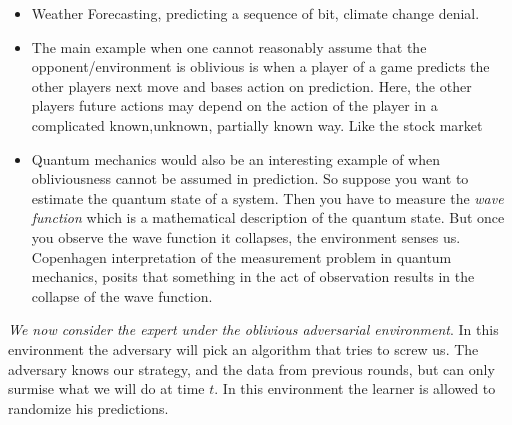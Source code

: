 \documentclass[11pt]{article}
\theoremstyle{quest}
\begin{document}
\begin{itemize}
	\item Weather Forecasting, predicting a sequence of bit, climate change denial.  
	\item The main example when one cannot reasonably assume that the opponent/environment is oblivious is when a player of a game predicts the other players next move and bases action on prediction. Here, the other players future actions may depend on the action of the player in a complicated known,unknown, partially known way. Like the stock market
	\item Quantum mechanics would also be an interesting example of when obliviousness cannot be assumed in prediction. So suppose you want to estimate the quantum state of a system. Then you have to measure the \textit{wave function} which is a mathematical description of the quantum state. But once you observe the wave function it collapses, the environment senses us. Copenhagen interpretation  of the measurement problem in  quantum mechanics, posits that something in the act of observation results in the collapse of the wave function. 
\end{itemize}
%
\textit{We now consider the expert under the oblivious adversarial environment}. In this environment the adversary will pick an algorithm that tries to screw us. The adversary knows our strategy, and the data from previous rounds, but can only surmise what we will do at time $t$. In this environment the learner is allowed to randomize his predictions. 
\end{document}
